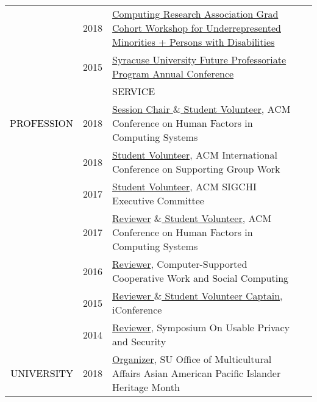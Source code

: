 \documentclass[12pt]{article}
\begin{document}
{{\begin{longtable}{Rp{1.0in}p{0.25in}p{4.75in}}
& \footnotesize{2018} & \href{https://cra.org/events/urmgradcohort/}{{Computing Research Association Grad Cohort Workshop for Underrepresented Minorities + Persons with Disabilities}} \\

& \footnotesize{2015} & \href{http://graduateschool.syr.edu/programs/future-professoriate-program/}{{Syracuse University Future Professoriate Program Annual Conference}} \bigskip \\

&&\par \Large \textcolor{black}{\uppercase{Service}}\\ \hhline{~~-}

\textcolor{black}{\footnotesize{\uppercase{Profession}}} & \footnotesize{2018} & \href{https://chi2018.acm.org}{{Session Chair $\&$  Student Volunteer}}, ACM Conference on Human Factors in Computing Systems \\

& \footnotesize{2018} & \href{http://group.acm.org/conferences/group18/index.html}{{Student Volunteer}}, ACM International Conference on Supporting Group Work \\

& \footnotesize{2017} & \href{https://sigchi.org/}{{Student Volunteer}}, ACM SIGCHI Executive Committee \\

& \footnotesize{2017} & \href{https://chi2017.acm.org/}{{Reviewer}} \href{http://ischools.org/the-iconference/}{{$\&$  Student Volunteer}}, ACM Conference on Human Factors in Computing Systems \\

& \footnotesize{2016} & \href{https://cscw.acm.org/}{{Reviewer}}, Computer-Supported Cooperative Work and Social Computing \\

& \footnotesize{2015} & \href{http://ischools.org/the-iconference/}{{Reviewer $\&$  Student Volunteer Captain}}, iConference \\

& \footnotesize{2014} & \href{https://www.usenix.org/sites/default/files/soups14_proceedings.pdf}{{Reviewer}}, Symposium On Usable Privacy and Security \\

\textcolor{black}{\footnotesize{\uppercase{University}}} & \footnotesize{2018} & \href{http://dailyorange.com/2018/04/asian-american-pacific-islander-students-celebrate-place-syracuse-university/}{{Organizer}}, SU Office of Multicultural Affairs Asian American Pacific Islander Heritage Month \\


\end{longtable}}}
\end{document}
